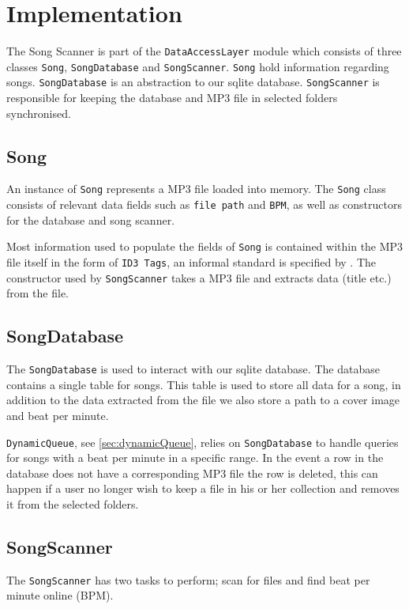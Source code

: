 \section{Implementation}
The Song Scanner is part of the \texttt{DataAccessLayer} module which consists of three classes \texttt{Song}, \texttt{SongDatabase} and \texttt{SongScanner}. \texttt{Song} hold information regarding songs. \texttt{SongDatabase} is an abstraction to our sqlite database. \texttt{SongScanner} is responsible for keeping the database and MP3 file in selected folders synchronised.

\subsection{Song}
An instance of \texttt{Song} represents a MP3 file loaded into memory. The \texttt{Song} class consists of relevant data fields such as \texttt{file path} and \texttt{BPM}, as well as constructors for the database and song scanner. 

Most information used to populate the fields of \texttt{Song} is contained within the MP3 file itself in the form of \texttt{ID3 Tags}, an informal standard is specified by \citet{ID3:standard}. The constructor used by \texttt{SongScanner} takes a MP3 file and extracts data (title etc.) from the file.

\subsection{SongDatabase}
The \texttt{SongDatabase} is used to interact with our sqlite database. The database contains a single table for songs. This table is used to store all data for a song, in addition to the data extracted from the file we also store a path to a cover image and beat per minute.

\texttt{DynamicQueue}, see \cref{sec:dynamicQueue}, relies on \texttt{SongDatabase} to handle queries for songs with a beat per minute in a specific range. In the event a row in the database does not have a corresponding MP3 file the row is deleted, this can happen if a user no longer wish to keep a file in his or her collection and removes it from the selected folders. 

\subsection{SongScanner} 
The \texttt{SongScanner} has two tasks to perform; scan for files and find beat per minute online (BPM).

